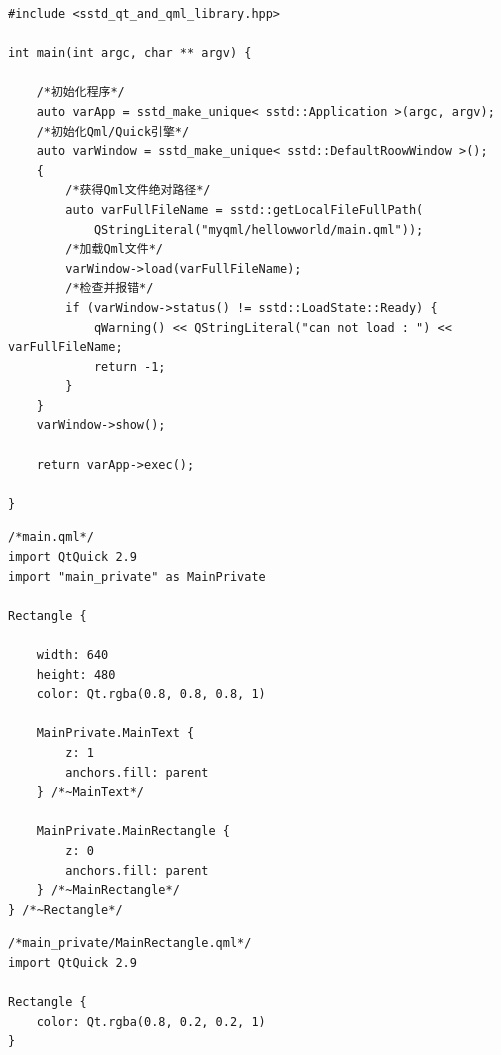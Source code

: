\begin{lstlisting}[label=f000030,
caption=GoodLuck,
title=\lstlistingname\ \thelstlisting
]
#include <sstd_qt_and_qml_library.hpp>

int main(int argc, char ** argv) {

    /*初始化程序*/
    auto varApp = sstd_make_unique< sstd::Application >(argc, argv);
    /*初始化Qml/Quick引擎*/
    auto varWindow = sstd_make_unique< sstd::DefaultRoowWindow >();
    {
        /*获得Qml文件绝对路径*/
        auto varFullFileName = sstd::getLocalFileFullPath(
            QStringLiteral("myqml/hellowworld/main.qml"));
        /*加载Qml文件*/
        varWindow->load(varFullFileName);
        /*检查并报错*/
        if (varWindow->status() != sstd::LoadState::Ready) {
            qWarning() << QStringLiteral("can not load : ") << varFullFileName;
            return -1;
        }
    }
    varWindow->show();

    return varApp->exec();

}
\end{lstlisting}          %
\begin{lstlisting}[label=f000031,
caption=GoodLuck,
title=\lstlistingname\ \thelstlisting
]
/*main.qml*/
import QtQuick 2.9
import "main_private" as MainPrivate

Rectangle {

    width: 640
    height: 480
    color: Qt.rgba(0.8, 0.8, 0.8, 1)

    MainPrivate.MainText {
        z: 1
        anchors.fill: parent
    } /*~MainText*/

    MainPrivate.MainRectangle {
        z: 0
        anchors.fill: parent
    } /*~MainRectangle*/
} /*~Rectangle*/
\end{lstlisting}          %
\begin{lstlisting}[label=f000032,
caption=GoodLuck,
title=\lstlistingname\ \thelstlisting
]
/*main_private/MainRectangle.qml*/
import QtQuick 2.9

Rectangle {
    color: Qt.rgba(0.8, 0.2, 0.2, 1)
}
\end{lstlisting}          %
